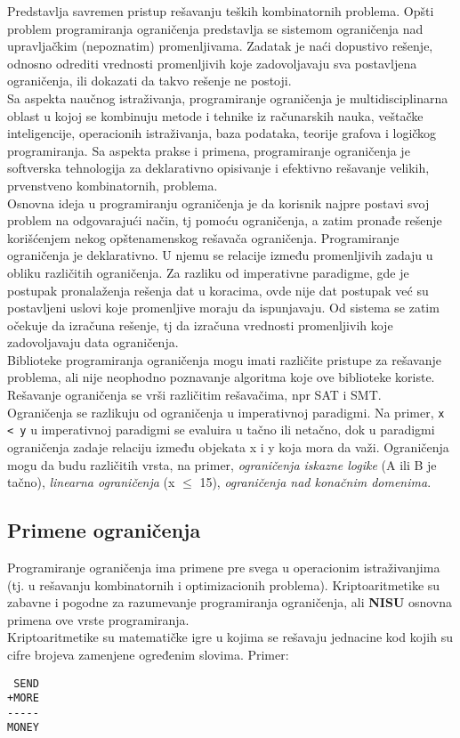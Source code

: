 \documentclass[../main.tex]{subfiles}
\begin{document}
Predstavlja savremen pristup rešavanju teških kombinatornih problema. Opšti problem programiranja ograničenja predstavlja se sistemom ograničenja nad upravljačkim (nepoznatim) promenljivama. Zadatak je naći dopustivo rešenje, odnosno odrediti vrednosti promenljivih koje zadovoljavaju sva postavljena ograničenja, ili dokazati da takvo rešenje ne postoji.
\\
Sa aspekta naučnog istraživanja, programiranje ograničenja je multidisciplinarna oblast u kojoj se kombinuju metode i tehnike iz računarskih nauka, veštačke inteligencije, operacionih istraživanja, baza podataka, teorije grafova i logičkog programiranja. Sa aspekta prakse i primena, programiranje ograničenja je softverska tehnologija za deklarativno opisivanje i efektivno rešavanje velikih, prvenstveno kombinatornih, problema.
\\
Osnovna ideja u programiranju ograničenja je da korisnik najpre postavi svoj problem na odgovarajući način, tj pomoću ograničenja, a zatim pronađe rešenje korišćenjem nekog opštenamenskog rešavača ograničenja. Programiranje ograničenja je deklarativno. U njemu se relacije između promenljivih zadaju u obliku različitih ograničenja. Za razliku od imperativne paradigme, gde je postupak pronalaženja rešenja dat u koracima, ovde nije dat postupak već su postavljeni uslovi koje promenljive moraju da ispunjavaju. Od sistema se zatim očekuje da izračuna rešenje, tj da izračuna vrednosti promenljivih koje zadovoljavaju data ograničenja. \\
Biblioteke programiranja ograničenja mogu imati različite pristupe za rešavanje problema, ali nije neophodno poznavanje algoritma koje ove biblioteke koriste. Rešavanje ograničenja se vrši različitim rešavačima, npr SAT i SMT.\\
Ograničenja se razlikuju od ograničenja u imperativnoj paradigmi. Na primer, \texttt{x < y} u imperativnoj paradigmi se evaluira u tačno ili netačno, dok u paradigmi ograničenja zadaje relaciju između objekata x i y koja mora da važi. Ograničenja mogu da budu različitih vrsta, na primer, {\it ograničenja iskazne logike} (A ili B je tačno), {\it linearna ograničenja} (x $\le$ 15), {\it ograničenja nad konačnim domenima}. 

\subsection{Primene ograničenja}											%

Programiranje ograničenja ima primene pre svega u operacionim istraživanjima (tj. u rešavanju kombinatornih i optimizacionih problema). Kriptoaritmetike su zabavne i pogodne za razumevanje programiranja ograničenja, ali {\bf NISU} osnovna primena ove vrste programiranja. \\
Kriptoaritmetike su matematičke igre u kojima se rešavaju jednacine kod kojih su cifre brojeva zamenjene ogređenim slovima. Primer:
\begin{boxprimer}[width=\linewidth/3, breakable]
\begin{verbatim}
 SEND
+MORE
-----
MONEY	
\end{verbatim}
\end{boxprimer}
\end{document}
